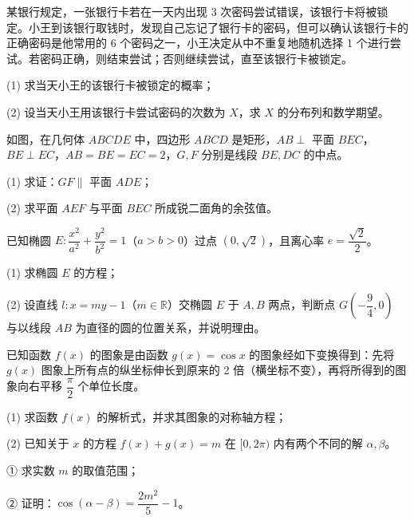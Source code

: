 \begin{question}
某银行规定，一张银行卡若在一天内出现 3 次密码尝试错误，该银行卡将被锁定。小王到该银行取钱时，发现自己忘记了银行卡的密码，但可以确认该银行卡的正确密码是他常用的 6 个密码之一，小王决定从中不重复地随机选择 1 个进行尝试。若密码正确，则结束尝试；否则继续尝试，直至该银行卡被锁定。

(1) 求当天小王的该银行卡被锁定的概率；

(2) 设当天小王用该银行卡尝试密码的次数为 $X$，求 $X$ 的分布列和数学期望。

\Needspace{0.4\textheight}
\end{question}
\begin{question}
如图，在几何体 $ABCDE$ 中，四边形 $ABCD$ 是矩形，$AB\perp$ 平面 $BEC$，$BE\perp EC$，$AB=BE=EC=2$，$G,F$ 分别是线段 $BE,DC$ 的中点。

(1) 求证：$GF\parallel$ 平面 $ADE$；

(2) 求平面 $AEF$ 与平面 $BEC$ 所成锐二面角的余弦值。
\nopagebreak[4]
\begin{center}\end{center}
\nopagebreak[4]
\Needspace{0.4\textheight}
\end{question}
\begin{question}
已知椭圆 $E:\dfrac{x^2}{a^2}+\dfrac{y^2}{b^2}=1$（$a>b>0$）过点 $(0,\sqrt2)$，且离心率 $e=\dfrac{\sqrt2}{2}$。

(1) 求椭圆 $E$ 的方程；

(2) 设直线 $l:x=my-1$（$m\in\mathbb{R}$）交椭圆 $E$ 于 $A,B$ 两点，判断点 $G\!\left(-\dfrac94,0\right)$ 与以线段 $AB$ 为直径的圆的位置关系，并说明理由。
\nopagebreak[4]
\begin{center}\end{center}
\nopagebreak[4]
\end{question}
\begin{question}
已知函数 $f(x)$ 的图象是由函数 $g(x)=\cos x$ 的图象经如下变换得到：先将 $g(x)$ 图象上所有点的纵坐标伸长到原来的 2 倍（横坐标不变），再将所得到的图象向右平移 $\dfrac\pi2$ 个单位长度。

(1) 求函数 $f(x)$ 的解析式，并求其图象的对称轴方程；

(2) 已知关于 $x$ 的方程 $f(x)+g(x)=m$ 在 $[0,2\pi)$ 内有两个不同的解 $\alpha,\beta$。

① 求实数 $m$ 的取值范围；

② 证明：$\cos(\alpha-\beta)=\dfrac{2m^2}{5}-1$。

\end{question}
